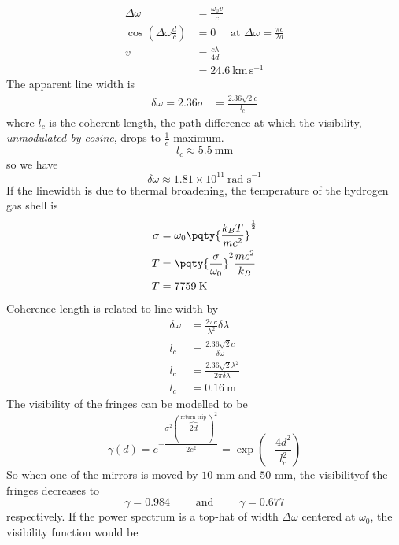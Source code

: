\documentclass[12pt]{extarticle}
\begin{document}
\begin{outline}[enumerate]
\begin{align*}
            \Delta\omega &= \frac{\omega_0v}{c}\\
            \cos(\Delta \omega \frac{d}{c}) &= 0\quad  \text{ at }\Delta \omega = \frac{\pi c}{2d}\\
            v &= \frac{ c\lambda}{4d}\\
            &= 24.6\: \text{km}\,\text{s}^{-1}
        \end{align*}
        The apparent line width  is 
        \begin{align*}
            \delta\omega =2.36\sigma &= \frac{2.36 \sqrt{2}c}{l_c}
        \end{align*}
        where \(l_c \) is the coherent length, the path difference at which the visibility, \emph{unmodulated by cosine}, drops to \(\frac{1}{e}\) maximum. \[
            l_c \approx 5.5\: \text{mm}
        \]
        so we have\[
            \delta\omega \approx 1.81 \times 10^{11}\:  \text{rad s}^{-1}
        \]
        If the linewidth is due to thermal broadening, the temperature of the hydrogen gas shell is \begin{align*}
            \sigma &=  \omega_0\pqty{\frac{k_BT}{mc^2}}^\frac{1}{2}\\
            T &= \pqty{\frac{\sigma}{\omega_0}}^2\frac{mc^2}{k_B}\\
            T &= 7759\: \text{K}
        \end{align*}
        \1 \2 Coherence length is related to line width by \begin{align*}
            \delta \omega &=  \frac{2\pi c}{\lambda^2} \delta \lambda\\
            l_c &= \frac{2.36 \sqrt{2}c}{\delta \omega}\\
            l_c &= \frac{2.36 \sqrt{2} \lambda^2}{2\pi \delta \lambda}\\
            l_c &= 0.16\: \text{m}
        \end{align*}
        \2 The visibility of the fringes can be modelled to be \[
            \gamma(d) = e^{-\dfrac{\sigma^2 (\, \overbrace{2d}^\text{return trip}\,)^2}{2c^2}}= \exp( -\frac{4d^2}{l_c^2})
        \]
        So when one of the mirrors is moved by \(10\) mm and \(50\) mm, the visibilityof the fringes decreases to \begin{equation*}
            \gamma = 0.984\qquad\text{ and }\qquad\gamma = 0.677
        \end{equation*}
        respectively.
        \2 If the power spectrum is a top-hat of width \(\Delta\omega\) centered at \(\omega_0\), the visibility function would be\[
\]
\end{outline}
\end{document}
